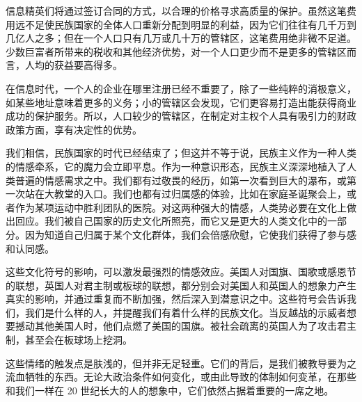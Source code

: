 信息精英们将通过签订合同的方式，以合理的价格寻求高质量的保护。虽然这笔费用远不足使民族国家的全体人口重新分配到明显的利益，因为它们往往有几千万到几亿人之多；但在一个人口只有几万或几十万的管辖区，这笔费用绝非微不足道。少数巨富者所带来的税收和其他经济优势，对一个人口更少而不是更多的管辖区而言，人均的获益要高得多。

在信息时代，一个人的企业在哪里注册已经不重要了，除了一些纯粹的消极意义，如某些地址意味着更多的义务；小的管辖区会发现，它们更容易打造出能获得商业成功的保护服务。所以，人口较少的管辖区，在制定对主权个人具有吸引力的财政政策方面，享有决定性的优势。

我们相信，民族国家的时代已经结束了；但这并不等于说，民族主义作为一种人类的情感牵系，它的魔力会立即平息。作为一种意识形态，民族主义深深地植入了人类普遍的情感需求之中。我们都有过敬畏的经历，如第一次看到巨大的瀑布，或第一次站在大教堂的入口。我们也都有过归属感的体验，比如在家庭圣诞聚会上，或者作为某项运动中胜利团队的医院。对这两种强大的情感，人类势必要在文化上做出回应。我们被自己国家的历史文化所照亮，而它又是更大的人类文化中的一部分。因为知道自己归属于某个文化群体，我们会倍感欣慰，它使我们获得了参与感和认同感。

这些文化符号的影响，可以激发最强烈的情感效应。美国人对国旗、国歌或感恩节的联想，英国人对君主制或板球的联想，都分别会对美国人和英国人的想象力产生真实的影响，并通过重复而不断加强，然后深入到潜意识之中。这些符号会告诉我们，我们是什么样的人，并提醒我们有着什么样的民族文化。当反越战的示威者想要撼动其他美国人时，他们点燃了美国的国旗。被社会疏离的英国人为了攻击君主制，甚至会在板球场上挖洞。

这些情绪的触发点是肤浅的，但并非无足轻重。它们的背后，是我们被教导要为之流血牺牲的东西。无论大政治条件如何变化，或由此导致的体制如何变革，在那些和我们一样在 20 世纪长大的人的想象中，它们依然占据着重要的一席之地。